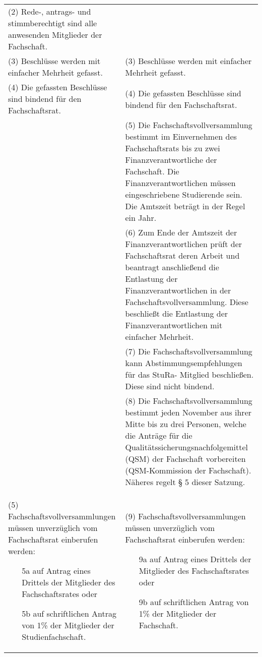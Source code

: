 {\begin{longtable}{|p{7.5cm}|p{7.5cm}|}
        (2)  Rede-, antrags- und stimmberechtigt sind alle anwesenden Mitglieder der
        Fachschaft. \\
        (3)  Beschlüsse werden mit einfacher Mehrheit gefasst.&
        (3)  Beschlüsse werden mit einfacher Mehrheit gefasst.\\
        (4)  Die gefassten Beschlüsse sind bindend für den Fachschaftsrat.&
        (4)  Die gefassten Beschlüsse sind bindend für den Fachschaftsrat.\\
        &
        (5) Die Fachschaftsvollversammlung bestimmt im Einvernehmen des Fachschaftsrats bis
        zu zwei Finanzverantwortliche der Fachschaft. Die Finanzverantwortlichen müssen
        eingeschriebene Studierende sein. Die Amtszeit beträgt in der Regel ein Jahr. \\
        &
        (6) Zum Ende der Amtszeit der Finanzverantwortlichen prüft der Fachschaftsrat deren
        Arbeit und beantragt anschließend die Entlastung der Finanzverantwortlichen in der
        Fachschaftsvollversammlung. Diese beschließt die Entlastung der
        Finanzverantwortlichen mit einfacher Mehrheit.\\
        &(7) Die Fachschaftsvollversammlung kann Abstimmungsempfehlungen für das StuRa-
        Mitglied beschließen. Diese sind nicht bindend.\\
        &(8) Die Fachschaftsvollversammlung bestimmt jeden November aus ihrer Mitte bis zu
        drei Personen, welche die Anträge für die Qualitätssicherungsnachfolgemittel (QSM)
        der Fachschaft vorbereiten (QSM-Kommission der Fachschaft). Näheres regelt § 5 dieser
        Satzung.\\
        (5)  Fachschaftsvollversammlungen müssen unverzüglich vom Fachschaftsrat
        einberufen werden:
        \begin{itemize}
        \item[5a]auf Antrag eines Drittels der Mitglieder des Fachschaftsrates oder
        \item[5b]auf schriftlichen Antrag von 1\% der Mitglieder der Studienfachschaft. 
        \end{itemize}&(9)  Fachschaftsvollversammlungen müssen unverzüglich vom Fachschaftsrat einberufen
        werden:
        \begin{itemize}
        \item[9a] auf Antrag eines Drittels der Mitglieder des Fachschaftsrates oder
        \item[9b] auf schriftlichen Antrag von 1\% der Mitglieder der Fachschaft. 

\end{itemize}
\end{longtable}}
